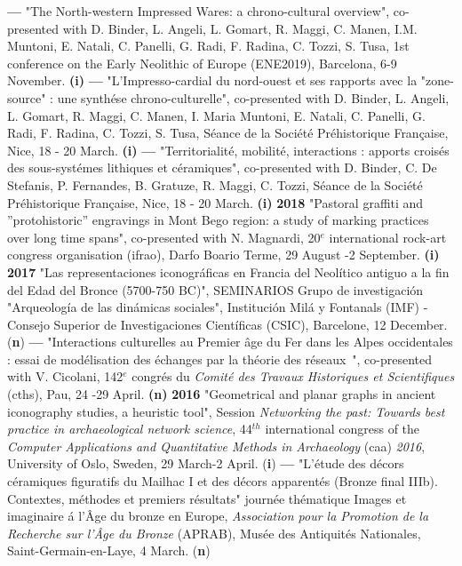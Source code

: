 \documentclass[11pt]{report} %
\begin{document}
\smallbreak
\textbf{---  }"The North-western Impressed Wares: a chrono-cultural overview", co-presented with D. Binder, L. Angeli, L. Gomart, R. Maggi, C. Manen, I.M. Muntoni, E. Natali, C. Panelli, G. Radi, F. Radina, C. Tozzi, S. Tusa, 1st conference on the Early Neolithic of Europe (ENE2019), Barcelona, 6-9 November. \textbf{(i)}
\smallbreak
\textbf{---  }"L'Impresso-cardial du nord-ouest et ses rapports avec la "zone-source" : une synth\'{e}se chrono-culturelle", co-presented with D. Binder, L. Angeli, L. Gomart, R. Maggi, C. Manen, I. Maria Muntoni, E. Natali, C. Panelli, G. Radi, F. Radina, C. Tozzi, S. Tusa, S\'{e}ance de la Soci\'{e}t\'{e} Pr\'{e}historique Fran\c{c}aise, Nice, 18 - 20 March.\textbf{ (i)}
\smallbreak
\textbf{---  }"Territorialit\'{e}, mobilit\'{e}, interactions : apports crois\'{e}s des sous-syst\'{e}mes lithiques et c\'{e}ramiques", co-presented with D. Binder, C. De Stefanis, P. Fernandes, B. Gratuze, R. Maggi, C. Tozzi, S\'{e}ance de la Soci\'{e}t\'{e} Pr\'{e}historique Fran\c{c}aise, Nice, 18 - 20 March.\textbf{ (i)}
\smallbreak
\textbf{2018 }"Pastoral graffiti and ''protohistoric'' engravings in Mont Bego region: a study of marking practices over long time spans", co-presented with N. Magnardi, 20${}^{e}$ international rock-art congress organisation (ifrao), Darfo Boario Terme, 29 August -2 September.\textbf{ (i)}
\smallbreak
\textbf{2017 }"Las representaciones iconogr\'{a}ficas en Francia del Neol\'{i}tico antiguo a la fin del Edad del Bronce (5700-750 BC)", SEMINARIOS Grupo de investigaci\'{o}n "Arqueolog\'{i}a de las din\'{a}micas sociales", Instituci\'{o}n Mil\'{a} y Fontanals (IMF) - Consejo Superior de Investigaciones Cient\'{i}ficas (CSIC), Barcelone, 12 December. (\textbf{n})
\smallbreak
\textbf{---  } "Interactions culturelles au Premier \^{a}ge du Fer dans les Alpes occidentales : essai de mod\'{e}lisation des \'{e}changes par la th\'{e}orie des r\'{e}seaux~", co-presented with V. Cicolani, 142${}^{e}$ congr\'{e}s du \textit{Comit\'{e} des Travaux Historiques et Scientifiques} (cths), Pau, 24 -29 April.\textbf{ (n)}
\textbf{2016 }"Geometrical and planar graphs in ancient iconography studies, a heuristic tool", Session \textit{Networking the past: Towards best practice in archaeological network science}, 44${}^{th}$ international congress of the \textit{Computer Applications and Quantitative Methods in Archaeology }(caa) \textit{2016}, University of Oslo, Sweden, 29 March-2 April. (\textbf{i})\textbf{}
\smallbreak
\textbf{---  }"L'\'{e}tude des d\'{e}cors c\'{e}ramiques figuratifs du Mailhac I et des d\'{e}cors apparent\'{e}s (Bronze final IIIb). Contextes, m\'{e}thodes et premiers r\'{e}sultats" journ\'{e}e th\'{e}matique Images et imaginaire \'{a} l'\^{A}ge du bronze en Europe, \textit{Association pour la Promotion de la Recherche sur l'\^{A}ge du Bronze} (APRAB), Mus\'{e}e des Antiquit\'{e}s Nationales, Saint-Germain-en-Laye, 4 March. (\textbf{n})
\end{document}
